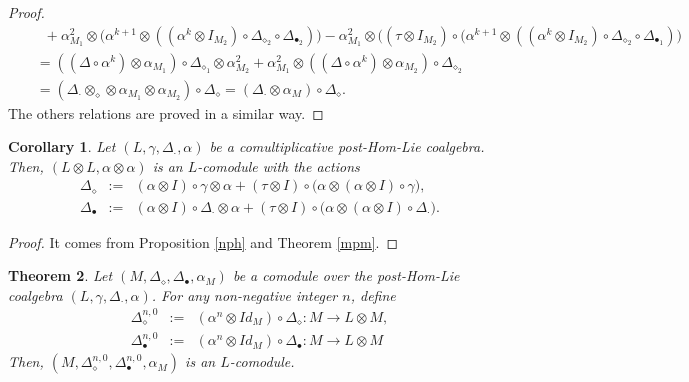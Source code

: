 \documentclass{article}
\newtheorem{thm}{Theorem}[section]
\newtheorem{cor}[thm]{Corollary}
\theoremstyle{definition}
\theoremstyle{remark}
\numberwithin{equation}{section}
\begin{document}
\begin{proof}
\begin{eqnarray}
&&\;\;+\alpha^2_{M_1}\otimes\Big(\alpha^{k+1}\otimes((\alpha^k\otimes I_{M_2})\circ\Delta_{\diamond_2}\circ\Delta_{\bullet_2})\Big)
-\alpha_{M_1}^2\otimes\Big((\tau\otimes I_{M_2})\circ(\alpha^{k+1}\otimes((\alpha^k\otimes I_{M_2})\circ\Delta_{\diamond_2}\circ\Delta_{\bullet_1})\Big)
\nonumber\\
&&=((\Delta\circ\alpha^k)\otimes\alpha_{M_1})\circ\Delta_{\diamond_1}\otimes\alpha^2_{M_2}+\alpha^2_{M_1}\otimes((\Delta\circ\alpha^k)\otimes\alpha_{M_2})\circ\Delta_{\diamond_2}\nonumber\\
&&=(\Delta_\cdot\otimes_\diamond\otimes\alpha_{M_1}\otimes\alpha_{M_2})\circ\Delta_\diamond=(\Delta_\cdot\otimes\alpha_M)\circ\Delta_\diamond.\nonumber
\end{eqnarray}
The others relations are proved in a similar way.
\end{proof}
\begin{cor}
 Let $(L, \gamma, \Delta_\cdot, \alpha)$ be a comultiplicative post-Hom-Lie coalgebra. Then, $(L\otimes L, \alpha\otimes\alpha)$ is an $L$-comodule
with the actions
 \begin{eqnarray}
  \Delta_\diamond &:=&(\alpha\otimes I)\circ\gamma\otimes\alpha + (\tau\otimes I)\circ\Big(\alpha\otimes(\alpha\otimes I)\circ\gamma\Big),\nonumber\\
  \Delta_\bullet&:=&(\alpha\otimes I)\circ\Delta_\cdot\otimes\alpha + (\tau\otimes I)\circ\Big(\alpha\otimes(\alpha\otimes I)\circ\Delta_\cdot\Big)\nonumber.
 \end{eqnarray}
\end{cor}
\begin{proof}
 It comes from Proposition \ref{nph} and Theorem \ref{mpm}.
\end{proof}
\begin{thm}
 Let $(M, \Delta_\diamond, \Delta_\bullet, \alpha_M)$ be a comodule over the post-Hom-Lie coalgebra $(L, \gamma, \Delta_\cdot, \alpha)$. For any non-negative integer $n$,
 define
\begin{eqnarray}
 \Delta^{n,0}_\diamond&:=&(\alpha^n\otimes Id_M)\circ\Delta_\diamond :  M\rightarrow L\otimes M,\label{ms1}\\
\Delta^{n,0}_\bullet&:=&(\alpha^n\otimes Id_M)\circ\Delta_\bullet :  M\rightarrow L\otimes M\label{ms2}
\end{eqnarray}
Then, $(M, \Delta^{n,0}_\diamond, \Delta^{n,0}_\bullet, \alpha_M)$ is an $L$-comodule.
\end{thm}
\end{document}
